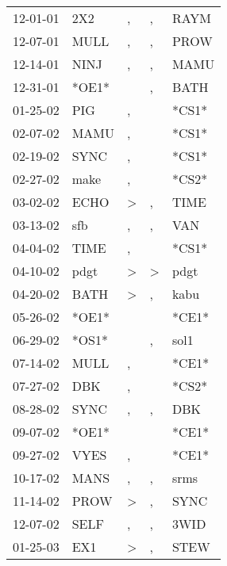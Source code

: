 \begin{supertabular}{lllll}
 12-01-01 &    2X2 &                , &             , &   RAYM \\
 12-07-01 &   MULL &                , &             , &   PROW \\
 12-14-01 &   NINJ &                , &             , &   MAMU \\
 12-31-01 &  *OE1* &                  &             , &   BATH \\
 01-25-02 &    PIG &                , &               &  *CS1* \\
 02-07-02 &   MAMU &                , &               &  *CS1* \\
 02-19-02 &   SYNC &                , &               &  *CS1* \\
 02-27-02 &   make &                , &               &  *CS2* \\
 03-02-02 &   ECHO &     \textgreater &             , &   TIME \\
 03-13-02 &    sfb &                , &             , &    VAN \\
 04-04-02 &   TIME &                , &               &  *CS1* \\
 04-10-02 &   pdgt &     \textgreater &  \textgreater &   pdgt \\
 04-20-02 &   BATH &     \textgreater &             , &   kabu \\
 05-26-02 &  *OE1* &                  &               &  *CE1* \\
 06-29-02 &  *OS1* &                  &             , &   sol1 \\
 07-14-02 &   MULL &                , &               &  *CE1* \\
 07-27-02 &    DBK &                , &               &  *CS2* \\
 08-28-02 &   SYNC &                , &             , &    DBK \\
 09-07-02 &  *OE1* &                  &               &  *CE1* \\
 09-27-02 &   VYES &                , &               &  *CE1* \\
 10-17-02 &   MANS &                , &             , &   srms \\
 11-14-02 &   PROW &     \textgreater &             , &   SYNC \\
 12-07-02 &   SELF &                , &             , &   3WID \\
 01-25-03 &    EX1 &     \textgreater &             , &   STEW \\

\end{supertabular}
